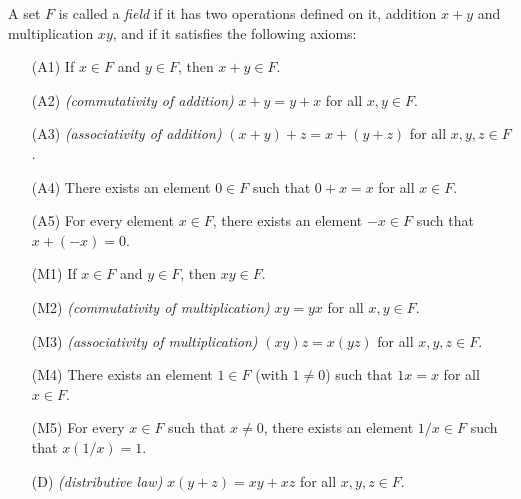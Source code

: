 \documentclass[../main.tex]{subfiles}
\begin{document}
\begin{definition} \label{def:field}
A set \( F \) is called a \textit{field} if it has two operations defined on it, addition \( x + y \) and multiplication \( xy \), and if it satisfies the following axioms:
\begin{itemize}
    \item[(A1)] If \( x \in F \) and \( y \in F \), then \( x + y \in F \).
    \item[(A2)] \textit{(commutativity of addition)} \( x + y = y + x \) for all \( x, y \in F \).
    \item[(A3)] \textit{(associativity of addition)} \( (x + y) + z = x + (y + z) \) for all \( x, y, z \in F \).
    \item[(A4)] There exists an element \( 0 \in F \) such that \( 0 + x = x \) for all \( x \in F \).
    \item[(A5)] For every element \( x \in F \), there exists an element \( -x \in F \) such that \( x + (-x) = 0 \).
    \item[(M1)] If \( x \in F \) and \( y \in F \), then \( xy \in F \).
    \item[(M2)] \textit{(commutativity of multiplication)} \( xy = yx \) for all \( x, y \in F \).
    \item[(M3)] \textit{(associativity of multiplication)} \( (xy)z = x(yz) \) for all \( x, y, z \in F \).
    \item[(M4)] There exists an element \( 1 \in F \) (with \( 1 \neq 0 \)) such that \( 1x = x \) for all \( x \in F \).
    \item[(M5)] For every \( x \in F \) such that \( x \neq 0 \), there exists an element \( 1/x \in F \) such that \( x(1/x) = 1 \).
    \item[(D)] \textit{(distributive law)} \( x(y+z) = xy + xz \) for all \( x, y, z \in F \).
\end{itemize}
\end{definition}
\end{document}
